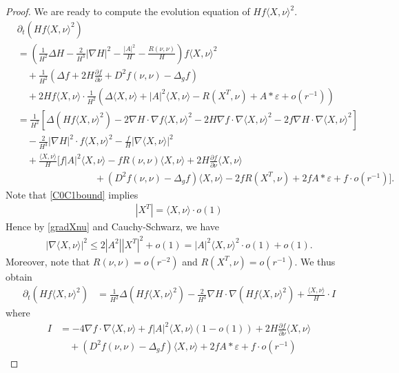 \documentclass[10pt,a4paper]{amsart}
\newcommand{\lt}{\left}
\newcommand{\na}{\nabla}
\newcommand{\pl}{\partial}
\newcommand{\rt}{\right}
\begin{document}
\begin{proof}
We are ready to compute the evolution equation of $H f \langle X,\nu \rangle^2$.
\begin{align*}
&\pl_t \lt( H f \langle X,\nu \rangle^2 \rt) \\
&= \lt( \frac{1}{H^2}\Delta H - \frac{2}{H^3} |\na H|^2 - \frac{|A|^2}{H} - \frac{R(\nu,\nu)}{H} \rt) f \langle X,\nu\rangle^2 \\
&\quad + \frac{1}{H^2} \lt(\Delta f +  2H \frac{\pl f}{\pl\nu} + D^2 f(\nu,\nu) - \Delta_g f \rt) \\
&\quad + 2 H f \langle X,\nu \rangle \cdot \frac{1}{H^2} \lt( \Delta \langle X,\nu \rangle + |A|^2 \langle X,\nu \rangle - R(X^T,\nu) + A * \varepsilon + o(r^{-1}) \rt)\\
&= \frac{1}{H^2} \lt[ \Delta (H f \langle X,\nu \rangle^2) - 2 \na H \cdot \na f \langle X,\nu \rangle^2 - 2 H \na f \cdot \na \langle X,\nu \rangle^2 - 2 f \na H \cdot \na\langle X,\nu \rangle^2 \rt] \\
&\quad - \frac{2}{H^3} |\na H|^2 \cdot f \langle X,\nu \rangle^2 - \frac{f}{H} |\na \langle X,\nu \rangle|^2  \\
&\quad + \frac{\langle X,\nu \rangle}{H} \Big[  f |A|^2 \langle X,\nu \rangle - f R(\nu,\nu) \langle X,\nu \rangle + 2 H \frac{\pl f}{\pl\nu} \langle X,\nu \rangle \\
&\qquad\qquad\qquad\qquad + (D^2 f(\nu,\nu) - \Delta_g f)\langle X,\nu \rangle - 2f R(X^T,\nu) + 2f A * \varepsilon + f \cdot o(r^{-1}) \Big].
\end{align*}
Note that \eqref{C0C1bound} implies 
\begin{align*}
|X^T| = \langle X,\nu \rangle \cdot o(1)
\end{align*} Hence by \eqref{gradXnu} and Cauchy-Schwarz, we have \begin{align*}
|\na\langle X,\nu \rangle|^2  \le 2 |A^2| |X^T|^2 + o(1) = |A|^2 \langle X,\nu \rangle^2 \cdot o(1) + o(1).
\end{align*}
Moreover, note that $R(\nu,\nu) = o(r^{-2})$ and $R(X^T,\nu) = o(r^{-1})$. We thus obtain
\begin{align*}
\pl_t \lt( Hf\langle X,\nu \rangle^2 \rt) &= \frac{1}{H^2}\Delta (Hf\langle X,\nu \rangle^2) - \frac{2}{H^3} \na H \cdot \na (Hf\langle X,\nu \rangle^2) + \frac{\langle X,\nu\rangle}{H} \cdot I
\end{align*}
where
\begin{align*}
I &= -4 \na f \cdot \na\langle X,\nu \rangle + f |A|^2 \langle X,\nu \rangle (1 - o(1)) + 2H \frac{\pl f}{\pl\nu} \langle X,\nu \rangle \\
&\quad +(D^2 f(\nu,\nu) - \Delta_g f)\langle X,\nu \rangle + 2f A * \varepsilon + f \cdot o(r^{-1})
\end{align*}


\end{proof}
\end{document}
